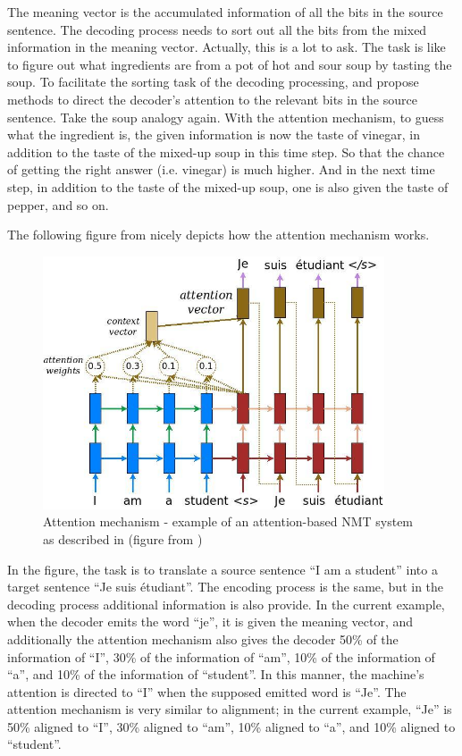 \documentclass[final]{ua-thesis}
\numberwithin{equation}{section}
\begin{document}
The meaning vector is the accumulated information of all the bits in the source sentence. The decoding process needs to sort out all the bits from the mixed information in the meaning vector. Actually, this is a lot to ask. The task is like to figure out what ingredients are from a pot of hot and sour soup by tasting the soup. To facilitate the sorting task of the decoding processing, \citet{bahdanau2014neural} and \citet{luong2015effective} propose methods to direct the decoder's attention to the relevant bits in the source sentence. Take the soup analogy again. With the attention mechanism, to guess what the ingredient is, the given information is now the taste of vinegar, in addition to the taste of the mixed-up soup in this time step. So that the chance of getting the right answer (i.e. vinegar) is much higher. And in the next time step, in addition to the taste of the mixed-up soup, one is also given the taste of pepper, and so on.   

The following figure from \citet{luong17GitHub} nicely depicts how the attention mechanism works. 

\begin{figure}[h]
\caption{Attention mechanism - example of an attention-based NMT system as described in \citet{luong2015effective} (figure from \citet{luong17GitHub})}
\centering
\includegraphics[width=0.9\textwidth]{attention_mechanism.jpg}
\end{figure} 

In the figure, the task is to translate a source sentence ``I am a student'' into a target sentence ``Je suis \'{e}tudiant''.
The encoding process is the same, but in the decoding process additional information is also provide. In the current example, when the decoder emits the word ``je'', it is given the meaning vector, and additionally the attention mechanism also gives the decoder 50\% of the information of ``I'', 30\% of the information of ``am'', 10\% of the information of ``a'', and 10\% of the information of ``student''. In this manner, the machine's attention is directed to ``I'' when the supposed emitted word is ``Je''. The attention mechanism is very similar to alignment; in the current example, ``Je'' is 50\% aligned to ``I'', 30\% aligned to ``am'', 10\% aligned to ``a'', and 10\% aligned to ``student''. 
\end{document}
